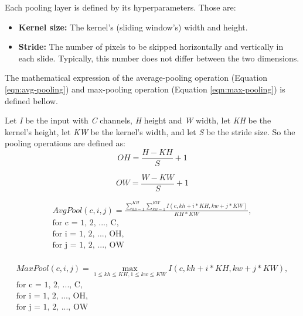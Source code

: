 Each pooling layer is defined by its hyperparameters. Those are:
\begin{itemize}
	\item \textbf{Kernel size:} The kernel's (sliding window's) width and height.
	\item \textbf{Stride:} The number of pixels to be skipped horizontally and vertically in each slide. Typically, this number does not differ between the two dimensions.
\end{itemize}

The mathematical expression of the average-pooling operation (Equation \ref{eqn:avg-pooling}) and max-pooling operation (Equation \ref{eqn:max-pooling}) is defined bellow.

Let \emph{I} be the input with \emph{C} channels, \emph{H} height and \emph{W} width, let \emph{KH} be the kernel's height, let \emph{KW} be the kernel's width, and let \emph{S} be the stride size. So the pooling operations are defined as:
\begin{equation}
	OH = \frac{H - KH}{S} + 1
\end{equation}

\begin{equation}
	OW = \frac{W - KW}{S} + 1
\end{equation}

\begin{equation}
	\label{eqn:avg-pooling}
	\begin{split}
		AvgPool(c, i, j) =
		\frac{
			\sum_{kh = 1}^{KH} \sum_{kw = 1}^{KW}
			I(c, kh + i * KH, kw + j * KW)
		}{
			KH * KW
		},\\
		\mbox{for c = 1, 2, ..., C},\\
		\mbox{for i = 1, 2, ..., OH},\\
		\mbox{for j = 1, 2, ..., OW}\\
	\end{split}
\end{equation}

\begin{equation}
	\label{eqn:max-pooling}
	\begin{split}
		MaxPool(c, i, j) = \max_{1 \leq kh \leq KH, 1 \leq kw \leq KW}
		I(c, kh + i * KH, kw + j * KW),\\
		\mbox{for c = 1, 2, ..., C},\\
		\mbox{for i = 1, 2, ..., OH},\\
		\mbox{for j = 1, 2, ..., OW}\\
	\end{split}
\end{equation}


